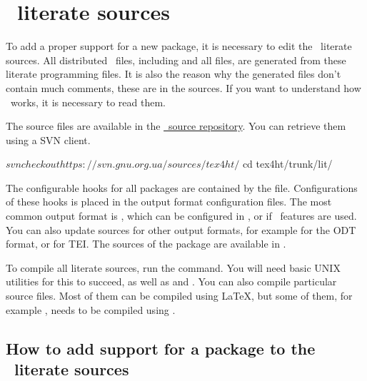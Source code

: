 
\section{\texfourht\ literate sources}

To add a proper support for a new package, it is necessary to edit the 
\texfourht\ literate sources. All distributed \texfourht\ files, including
 and all  files, are generated from these literate
programming files. It is also the reason why the generated files don't contain
much comments, these are in the sources. If you want to understand
how \texfourht\ works, it is necessary to read them.

The source files are available in the \href{https://puszcza.gnu.org.ua/projects/tex4ht/}{\texfourht\ source repository}.
You can retrieve them using a SVN client. 

\begin{shellcommand}
$ svn checkout https://svn.gnu.org.ua/sources/tex4ht/
$ cd tex4ht/trunk/lit/
\end{shellcommand}


The configurable hooks for all packages are contained by the  file.
Configurations of these hooks is placed in the output format configuration files.
The most common output format is \HTML, which can be configured in , or 
 if \HTMLV\ features are used. You can also update sources for other output
formats, for example  for the ODT format, or  for TEI.
The sources of the  package are available in .

To compile all literate sources, run the  command. You will need basic UNIX utilities 
for this to succeed, as well as  and . You can also compile particular source
files. Most of them can be compiled using \LaTeX, but some of them, for example , needs
to be compiled using .

\subsection{How to add support for a package to the \texfourht\ literate sources}

